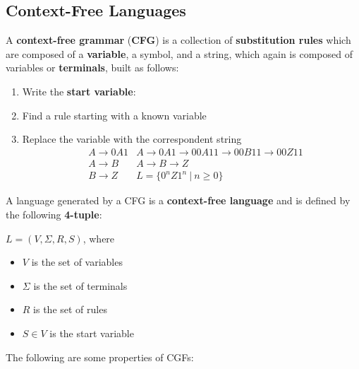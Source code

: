 \documentclass{article}
\begin{document}
\subsection{Context-Free Languages}
A \textbf{context-free grammar} (\textbf{CFG}) is a collection of \textbf{substitution rules} which are composed of a \textbf{variable}, a symbol, and a string, which again is composed of variables or \textbf{terminals}, built as follows:
\begin{enumerate}
    \item Write the \textbf{start variable}:
    \item Find a rule starting with a known variable
    \item Replace the variable with the correspondent string
        \begin{align*}
            &A \rightarrow 0A1 &A\rightarrow0A1 \rightarrow00A11\rightarrow00B11\rightarrow00Z11 \\
            &A \rightarrow B &A\rightarrow B\rightarrow Z \\
            &B \rightarrow Z &L = \{0^nZ1^n \ | \ n\geq0\}
        \end{align*}
\end{enumerate}
A language generated by a CFG is a \textbf{context-free language} and is defined by the following \textbf{4-tuple}:
\begin{center}
    $L = (V,\Sigma, R, S)$, where
\end{center}
\begin{itemize}
    \item $V$ is the set of variables
    \item $\Sigma$ is the set of terminals
    \item $R$ is the set of rules
    \item $S \in V$ is the start variable
\end{itemize}
\newpage
\noindent
The following are some properties of CGFs:
\end{document}
